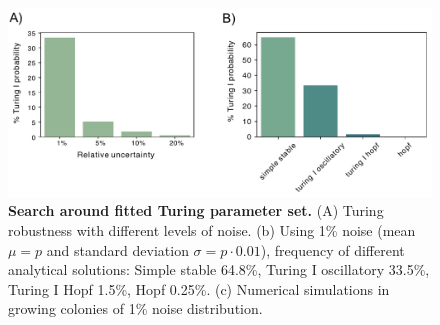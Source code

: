 \begin{figure}[H] %
    \centering
    \begin{adjustbox}{center}
        \includegraphics[width=1\textwidth]{chapters/Chapter 2/robustness_noise} %
    \end{adjustbox}
    \caption{\textbf{Search around fitted Turing parameter set.} (A) Turing robustness with different levels of noise. (b) Using 1\% noise (mean $\mu=p$ and standard deviation $\sigma=p\cdot 0.01$), frequency of different analytical solutions: Simple stable 64.8\%, Turing I oscillatory 33.5\%, Turing I Hopf 1.5\%, Hopf 0.25\%. (c) Numerical simulations in growing colonies of 1\% noise distribution.}
    \label{fig:robustness_noise}
\end{figure}




